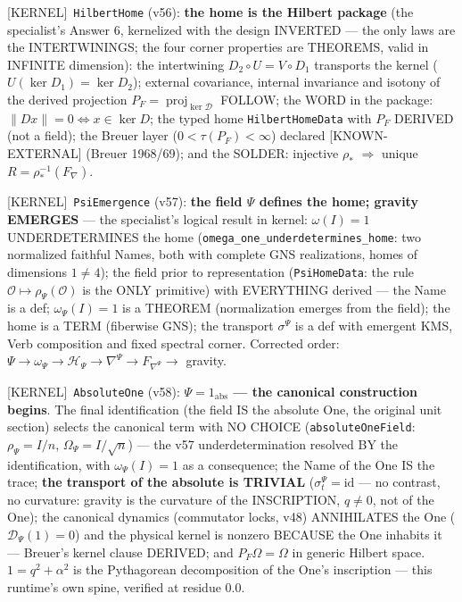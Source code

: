 \documentclass[11pt]{article}
\providecommand{\kernelmk}[1]{\textsf{[KERNEL]}~\texttt{#1}}\providecommand{\knownmk}[1]{\textsf{[KNOWN]}~{#1}}\providecommand{\statusmk}[1]{\textsf{[#1]}}
\theoremstyle{definition}\newtheorem{deriv}{Derivation}
\begin{document}
\kernelmk{HilbertHome} (v56): \textbf{the home is the Hilbert package} (the specialist's Answer 6, kernelized with the design INVERTED --- the only laws are the INTERTWININGS; the four corner properties are THEOREMS, valid in INFINITE dimension): the intertwining $D_2\circ U=V\circ D_1$ transports the kernel ($U(\ker D_1)=\ker D_2$); external covariance, internal invariance and isotony of the derived projection $P_F=\operatorname{proj}_{\ker\mathcal D}$ FOLLOW; the WORD in the package: $\|Dx\|=0\iff x\in\ker D$; the typed home \texttt{HilbertHomeData} with $P_F$ DERIVED (not a field); the Breuer layer ($0<\tau(P_F)<\infty$) declared \statusmk{KNOWN-EXTERNAL} (Breuer 1968/69); and the SOLDER: injective $\rho_*$ $\Rightarrow$ unique $R=\rho_*^{-1}(F_\nabla)$.

\kernelmk{PsiEmergence} (v57): \textbf{the field $\Psi$ defines the home; gravity EMERGES} --- the specialist's logical result in kernel: $\omega(I)=1$ UNDERDETERMINES the home (\texttt{omega\_one\_underdetermines\_home}: two normalized faithful Names, both with complete GNS realizations, homes of dimensions $1\neq4$); the field prior to representation (\texttt{PsiHomeData}: the rule $\mathcal O\mapsto\rho_\Psi(\mathcal O)$ is the ONLY primitive) with EVERYTHING derived --- the Name is a def; $\omega_\Psi(I)=1$ is a THEOREM (normalization emerges from the field); the home is a TERM (fiberwise GNS); the transport $\sigma^\Psi$ is a def with emergent KMS, Verb composition and fixed spectral corner. Corrected order: $\Psi\to\omega_\Psi\to\mathcal H_\Psi\to\nabla^\Psi\to F_{\nabla^\Psi}\to$ gravity.

\kernelmk{AbsoluteOne} (v58): \textbf{$\Psi=1_{\mathrm{abs}}$ --- the canonical construction begins}. The final identification (the field IS the absolute One, the original unit section) selects the canonical term with NO CHOICE (\texttt{absoluteOneField}: $\rho_\Psi=I/n$, $\Omega_\Psi=I/\sqrt n$) --- the v57 underdetermination resolved BY the identification, with $\omega_\Psi(I)=1$ as a consequence; the Name of the One IS the trace; \textbf{the transport of the absolute is TRIVIAL} ($\sigma^\Psi_t=\mathrm{id}$ --- no contrast, no curvature: gravity is the curvature of the INSCRIPTION, $q\neq0$, not of the One); the canonical dynamics (commutator locks, v48) ANNIHILATES the One ($\mathcal D_\Psi(1)=0$) and the physical kernel is nonzero BECAUSE the One inhabits it --- Breuer's kernel clause DERIVED; and $P_F\Omega=\Omega$ in generic Hilbert space. $1=q^2+\alpha^2$ is the Pythagorean decomposition of the One's inscription --- this runtime's own spine, verified at residue $0.0$.
\end{document}
